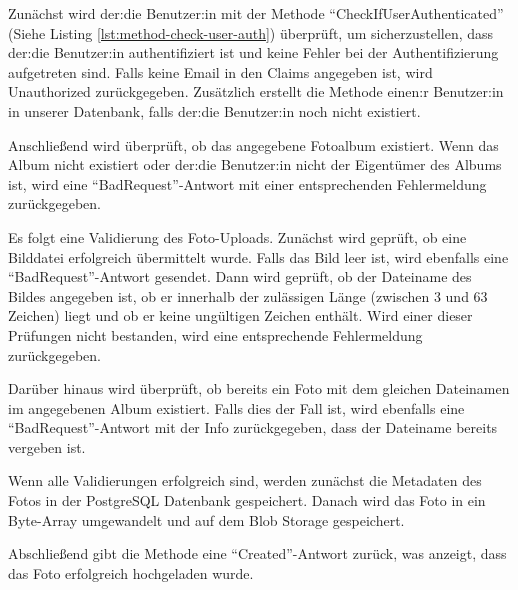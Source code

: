 Zunächst wird der:die Benutzer:in mit der Methode ``CheckIfUserAuthenticated'' (Siehe Listing 
\ref{lst:method-check-user-auth}) überprüft, um sicherzustellen, dass der:die Benutzer:in 
authentifiziert ist und keine Fehler bei der Authentifizierung aufgetreten sind. 
Falls keine Email in den Claims angegeben ist, wird Unauthorized zurückgegeben. 
Zusätzlich erstellt die Methode einen:r Benutzer:in in unserer Datenbank, falls
der:die Benutzer:in noch nicht existiert.

Anschlie\ss{}end wird überprüft, ob das angegebene Fotoalbum existiert. Wenn das 
Album nicht existiert oder der:die Benutzer:in nicht der Eigentümer des Albums ist, 
wird eine ``BadRequest''-Antwort mit einer entsprechenden Fehlermeldung zurückgegeben.

Es folgt eine Validierung des Foto-Uploads. Zunächst wird geprüft, ob eine Bilddatei 
erfolgreich übermittelt wurde. Falls das Bild leer ist, wird ebenfalls eine 
``BadRequest''-Antwort gesendet. Dann wird geprüft, ob der Dateiname des Bildes 
angegeben ist, ob er innerhalb der zulässigen Länge (zwischen 3 und 63 Zeichen) liegt 
und ob er keine ungültigen Zeichen enthält. Wird einer dieser Prüfungen nicht bestanden, 
wird eine entsprechende Fehlermeldung zurückgegeben.

Darüber hinaus wird überprüft, ob bereits ein Foto mit dem gleichen Dateinamen im 
angegebenen Album existiert. Falls dies der Fall ist, wird ebenfalls eine 
``BadRequest''-Antwort mit der Info zurückgegeben, dass der Dateiname bereits vergeben ist.

Wenn alle Validierungen erfolgreich sind, werden zunächst die Metadaten des Fotos in der
PostgreSQL Datenbank gespeichert. Danach wird das Foto in ein Byte-Array umgewandelt und auf
dem Blob Storage gespeichert.

Abschlie\ss{}end gibt die Methode eine ``Created''-Antwort zurück, was anzeigt, dass das Foto 
erfolgreich hochgeladen wurde.


